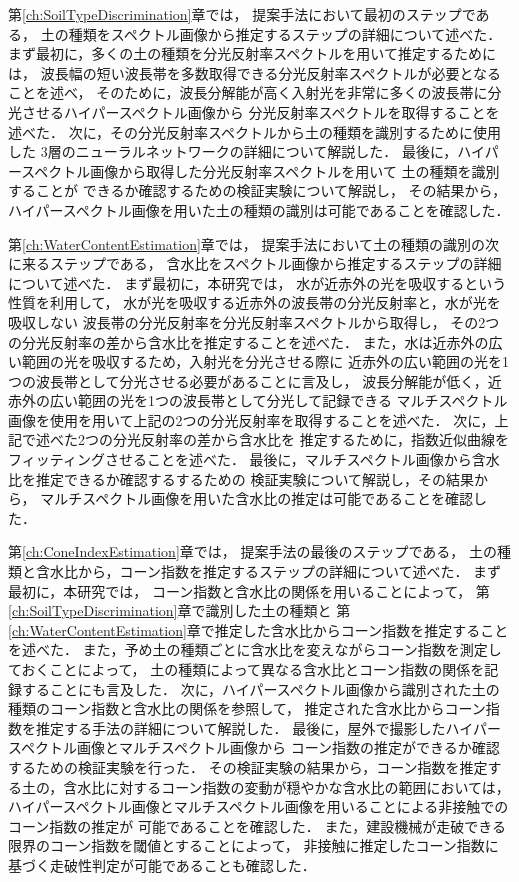 第\ref{ch:SoilTypeDiscrimination}章では，
提案手法において最初のステップである，
土の種類をスペクトル画像から推定するステップの詳細について述べた．
%
まず最初に，多くの土の種類を分光反射率スペクトルを用いて推定するためには，
波長幅の短い波長帯を多数取得できる分光反射率スペクトルが必要となることを述べ，
そのために，波長分解能が高く入射光を非常に多くの波長帯に分光させるハイパースペクトル画像から
分光反射率スペクトルを取得することを述べた．
%
次に，その分光反射率スペクトルから土の種類を識別するために使用した
3層のニューラルネットワークの詳細について解説した．
% 
最後に，ハイパースペクトル画像から取得した分光反射率スペクトルを用いて
土の種類を識別することが
できるか確認するための検証実験について解説し，
その結果から，ハイパースペクトル画像を用いた土の種類の識別は可能であることを確認した．

第\ref{ch:WaterContentEstimation}章では，
提案手法において土の種類の識別の次に来るステップである，
含水比をスペクトル画像から推定するステップの詳細について述べた．
%
まず最初に，本研究では，
水が近赤外の光を吸収するという性質を利用して，
水が光を吸収する近赤外の波長帯の分光反射率と，水が光を吸収しない
波長帯の分光反射率を分光反射率スペクトルから取得し，
その2つの分光反射率の差から含水比を推定することを述べた．
%
また，水は近赤外の広い範囲の光を吸収するため，入射光を分光させる際に
近赤外の広い範囲の光を1つの波長帯として分光させる必要があることに言及し，
波長分解能が低く，近赤外の広い範囲の光を1つの波長帯として分光して記録できる
マルチスペクトル画像を使用を用いて上記の2つの分光反射率を取得することを述べた．
次に，上記で述べた2つの分光反射率の差から含水比を
推定するために，指数近似曲線をフィッティングさせることを述べた．
%
最後に，マルチスペクトル画像から含水比を推定できるか確認するするための
検証実験について解説し，その結果から，
マルチスペクトル画像を用いた含水比の推定は可能であることを確認した．

第\ref{ch:ConeIndexEstimation}章では，
提案手法の最後のステップである，
土の種類と含水比から，コーン指数を推定するステップの詳細について述べた．
% 
まず最初に，本研究では，
コーン指数と含水比の関係を用いることによって，
第\ref{ch:SoilTypeDiscrimination}章で識別した土の種類と
第\ref{ch:WaterContentEstimation}章で推定した含水比からコーン指数を推定することを述べた．
また，予め土の種類ごとに含水比を変えながらコーン指数を測定しておくことによって，
土の種類によって異なる含水比とコーン指数の関係を記録することにも言及した．
% 
次に，ハイパースペクトル画像から識別された土の種類のコーン指数と含水比の関係を参照して，
推定された含水比からコーン指数を推定する手法の詳細について解説した．
% 
最後に，屋外で撮影したハイパースペクトル画像とマルチスペクトル画像から
コーン指数の推定ができるか確認するための検証実験を行った．
その検証実験の結果から，コーン指数を推定する土の，含水比に対するコーン指数の変動が穏やかな含水比の範囲においては，
ハイパースペクトル画像とマルチスペクトル画像を用いることによる非接触でのコーン指数の推定が
可能であることを確認した．
また，建設機械が走破できる限界のコーン指数を閾値とすることによって，
非接触に推定したコーン指数に基づく走破性判定が可能であることも確認した．

